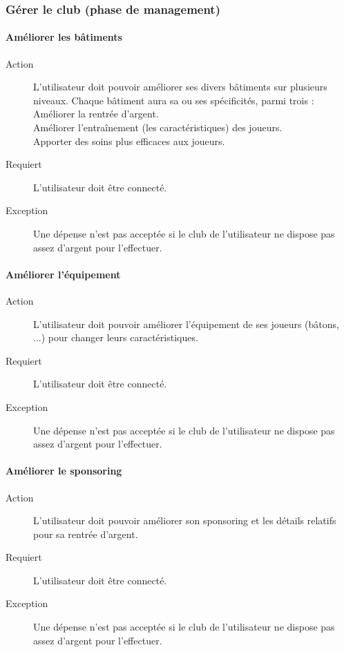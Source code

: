 \documentclass[a4paper]{article}
\begin{document}
\subsubsection{Gérer le \gls{club} (phase de management)}
\paragraph{Améliorer les bâtiments}
\begin{description}
\item[Action] L'\gls{utilisateur} doit pouvoir améliorer ses divers bâtiments sur plusieurs niveaux. Chaque bâtiment aura sa ou ses spécificités, parmi trois :\\
Améliorer la rentrée d'argent.\\
Améliorer l'entraînement (les caractéristiques) des joueurs.\\
Apporter des soins plus efficaces aux joueurs.
\item[Requiert] L'\gls{utilisateur} doit être connecté.
\item[Exception] Une dépense n'est pas acceptée si le \gls{club} de l'\gls{utilisateur} ne dispose pas assez d'argent pour l'effectuer.
\end{description}
\paragraph{Améliorer l'équipement}
\begin{description}
\item[Action] L'\gls{utilisateur} doit pouvoir améliorer l'équipement de ses joueurs (bâtons, ...) pour changer leurs caractéristiques.
\item[Requiert] L'\gls{utilisateur} doit être connecté.
\item[Exception] Une dépense n'est pas acceptée si le \gls{club} de l'\gls{utilisateur} ne dispose pas assez d'argent pour l'effectuer.
\end{description}
\paragraph{Améliorer le sponsoring}
\begin{description}
\item[Action] L'\gls{utilisateur} doit pouvoir améliorer son sponsoring et les détails relatifs pour sa rentrée d'argent.
\item[Requiert] L'\gls{utilisateur} doit être connecté.
\item[Exception] Une dépense n'est pas acceptée si le \gls{club} de l'\gls{utilisateur} ne dispose pas assez d'argent pour l'effectuer.
\end{description}
\end{document}
